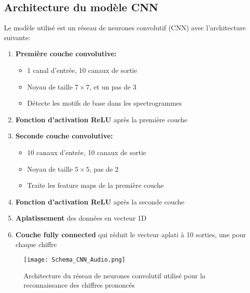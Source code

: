 \documentclass[11pt,a4paper]{article}
\begin{document}
\subsection{Architecture du modèle CNN}
\label{subsec:architecture}

Le modèle utilisé est un réseau de neurones convolutif (CNN) avec l'architecture suivante:

\begin{enumerate}
    \item \textbf{Première couche convolutive:}
    \begin{itemize}
        \item 1 canal d'entrée, 10 canaux de sortie
        \item Noyau de taille $7 \times 7$, et un pas de 3
        \item Détecte les motifs de base dans les spectrogrammes
    \end{itemize}
    
    \item \textbf{Fonction d'activation ReLU} après la première couche
    
    \item \textbf{Seconde couche convolutive:}
    \begin{itemize}
        \item 10 canaux d'entrée, 10 canaux de sortie
        \item Noyau de taille $5 \times 5$, pas de 2
        \item Traite les feature maps de la première couche
    \end{itemize}
    
    \item \textbf{Fonction d'activation ReLU} après la seconde couche
    
    \item \textbf{Aplatissement} des données en vecteur 1D
    
    \item \textbf{Couche fully connected} qui réduit le vecteur aplati à 10 sorties, une pour chaque chiffre
\end{enumerate}

\begin{figure}[H]
    \centering
    \texttt{[image: Schema\_CNN\_Audio.png]}
    \caption{Architecture du réseau de neurones convolutif utilisé pour la reconnaissance des chiffres prononcés}
    \label{fig:cnn_archi}
\end{figure}
\end{document}
